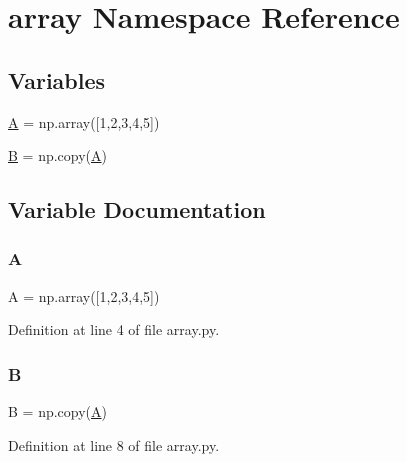 \hypertarget{namespacearray}{}\section{array Namespace Reference}
\label{namespacearray}
\subsection*{Variables}
\begin{DoxyCompactItemize}
\item 
\mbox{\hyperlink{namespacearray_a3b98e2dffc6cb06a89dcb0d5c60a0206}{A}} = np.\+array(\mbox{[}1,2,3,4,5\mbox{]})
\item 
\mbox{\hyperlink{namespacearray_a9d3d9048db16a7eee539e93e3618cbe7}{B}} = np.\+copy(\mbox{\hyperlink{namespacearray_a3b98e2dffc6cb06a89dcb0d5c60a0206}{A}})
\end{DoxyCompactItemize}


\subsection{Variable Documentation}
\mbox{\label{namespacearray_a3b98e2dffc6cb06a89dcb0d5c60a0206}} 
\subsubsection{\texorpdfstring{A}{A}}
{\footnotesize\ttfamily A = np.\+array(\mbox{[}1,2,3,4,5\mbox{]})}



Definition at line 4 of file array.\+py.

\mbox{\label{namespacearray_a9d3d9048db16a7eee539e93e3618cbe7}} 
\subsubsection{\texorpdfstring{B}{B}}
{\footnotesize\ttfamily B = np.\+copy(\mbox{\hyperlink{namespacearray_a3b98e2dffc6cb06a89dcb0d5c60a0206}{A}})}



Definition at line 8 of file array.\+py.

